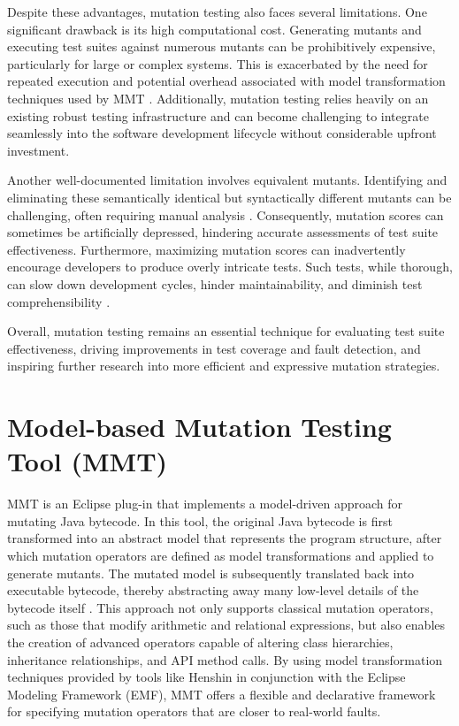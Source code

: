 \documentclass[sigplan, nonacm]{acmart}
\begin{document}
Despite these advantages, mutation testing also faces several limitations. One significant drawback is its high computational cost. Generating mutants and executing test suites against numerous mutants can be prohibitively expensive, particularly for large or complex systems. This is exacerbated by the need for repeated execution and potential overhead associated with model transformation techniques used by MMT \cite{bockisch_mutation_2024}. Additionally, mutation testing relies heavily on an existing robust testing infrastructure and can become challenging to integrate seamlessly into the software development lifecycle without considerable upfront investment.

Another well-documented limitation involves equivalent mutants. Identifying and eliminating these semantically identical but syntactically different mutants can be challenging, often requiring manual analysis \cite{jia_analysis_2011}. Consequently, mutation scores can sometimes be artificially depressed, hindering accurate assessments of test suite effectiveness. Furthermore, maximizing mutation scores can inadvertently encourage developers to produce overly intricate tests. Such tests, while thorough, can slow down development cycles, hinder maintainability, and diminish test comprehensibility \cite{offutt_mutation_2001,jia_analysis_2011}.

Overall, mutation testing remains an essential technique for evaluating test suite effectiveness, driving improvements in test coverage and fault detection, and inspiring further research into more efficient and expressive mutation strategies.

\section{Model-based Mutation Testing Tool (MMT)}
MMT is an Eclipse plug-in that implements a model-driven approach for mutating Java bytecode. In this tool, the original Java bytecode is first transformed into an abstract model that represents the program structure, after which mutation operators are defined as model transformations and applied to generate mutants. The mutated model is subsequently translated back into executable bytecode, thereby abstracting away many low-level details of the bytecode itself \cite{BockischDemonstration, Bockisch2024}. This approach not only supports classical mutation operators, such as those that modify arithmetic and relational expressions, but also enables the creation of advanced operators capable of altering class hierarchies, inheritance relationships, and API method calls. By using model transformation techniques provided by tools like Henshin in conjunction with the Eclipse Modeling Framework (EMF), MMT offers a flexible and declarative framework for specifying mutation operators that are closer to real-world faults.
\end{document}
